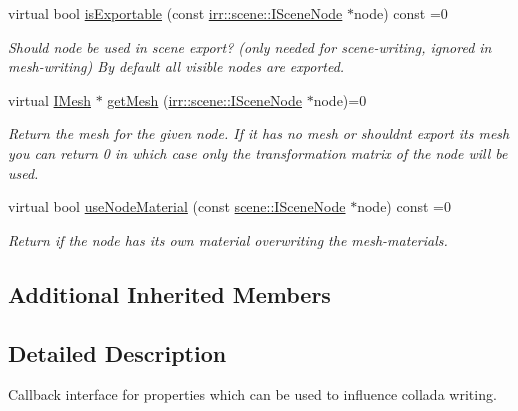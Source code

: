 \begin{DoxyCompactItemize}
virtual bool \hyperlink{classirr_1_1scene_1_1IColladaMeshWriterProperties_af24d1c12b3f4168407c078bd7fc3dc82}{is\+Exportable} (const \hyperlink{classirr_1_1scene_1_1ISceneNode}{irr\+::scene\+::\+I\+Scene\+Node} $\ast$node) const =0
\begin{DoxyCompactList}\small\item\em Should node be used in scene export? (only needed for scene-\/writing, ignored in mesh-\/writing) By default all visible nodes are exported. \end{DoxyCompactList}\item 
\mbox{\label{classirr_1_1scene_1_1IColladaMeshWriterProperties_ac6d9e1583642ac777471bd9225d72007}} 
virtual \hyperlink{classirr_1_1scene_1_1IMesh}{I\+Mesh} $\ast$ \hyperlink{classirr_1_1scene_1_1IColladaMeshWriterProperties_ac6d9e1583642ac777471bd9225d72007}{get\+Mesh} (\hyperlink{classirr_1_1scene_1_1ISceneNode}{irr\+::scene\+::\+I\+Scene\+Node} $\ast$node)=0
\begin{DoxyCompactList}\small\item\em Return the mesh for the given node. If it has no mesh or shouldn\textquotesingle{}t export it\textquotesingle{}s mesh you can return 0 in which case only the transformation matrix of the node will be used. \end{DoxyCompactList}\item 
virtual bool \hyperlink{classirr_1_1scene_1_1IColladaMeshWriterProperties_a9c10df4dc3602efbba6a47b34e2f8f4b}{use\+Node\+Material} (const \hyperlink{classirr_1_1scene_1_1ISceneNode}{scene\+::\+I\+Scene\+Node} $\ast$node) const =0
\begin{DoxyCompactList}\small\item\em Return if the node has it\textquotesingle{}s own material overwriting the mesh-\/materials. \end{DoxyCompactList}\end{DoxyCompactItemize}
\subsection*{Additional Inherited Members}


\subsection{Detailed Description}
Callback interface for properties which can be used to influence collada writing. 

